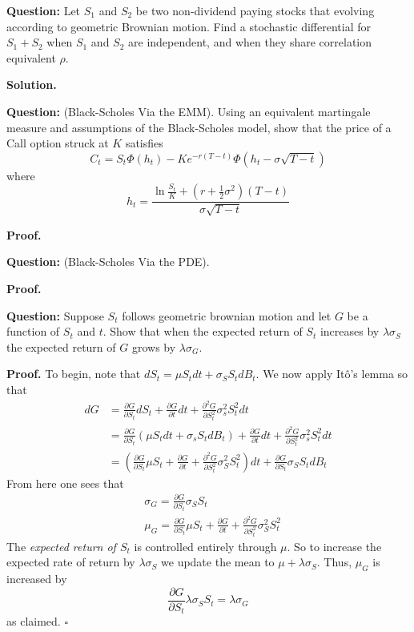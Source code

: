 \documentclass{article}
\begin{document}
\begin{tcolorbox}[colframe=black,colback=gray!5,boxrule=0.5pt]
\textbf{Question:} Let $S_1$ and $S_2$ be two non-dividend paying stocks that evolving according to geometric Brownian motion. Find a stochastic differential for $S_1 + S_2$ when $S_1$ and $S_2$ are independent, and when they share correlation equivalent $\rho$.  \cite{Hull}
\end{tcolorbox}
\textbf{Solution.}

\begin{tcolorbox}[colframe=black,colback=gray!5,boxrule=0.5pt]
\textbf{Question:} (Black-Scholes Via the EMM). Using an equivalent martingale measure and assumptions of the Black-Scholes model, show that the price of a Call option struck at $K$ satisfies
$$C_t = S_t\Phi(h_t) - Ke^{-r(T-t)}\Phi(h_t-\sigma\sqrt{T-t})$$
where 
$$h_t = \frac{\ln\frac{S_t}{K} + (r+\frac{1}{2}\sigma^2)(T-t)}{\sigma\sqrt{T-t}}$$
\end{tcolorbox}
\textbf{Proof.}

\begin{tcolorbox}[colframe=black,colback=gray!5,boxrule=0.5pt]
\textbf{Question:} (Black-Scholes Via the PDE). 
\end{tcolorbox}
\textbf{Proof.}


\begin{tcolorbox}[colframe=black,colback=gray!5,boxrule=0.5pt]
\textbf{Question:} Suppose $S_t$ follows geometric brownian motion and let $G$ be a function of $S_t$ and $t$. Show that when the expected return of $S_t$ increases by $\lambda \sigma _S$ the expected return of $G$ grows by $\lambda \sigma _G$. \cite{Hull}
\end{tcolorbox}
\textbf{Proof.} To begin, note that $dS_t = \mu S_t dt + \sigma_S S_tdB_t$. We now apply Itô's lemma so that 
\begin{align*}
   dG &= \frac{\partial G}{\partial S_t}dS_t + \frac{\partial G}{\partial t}dt + \frac{\partial^2 G}{\partial S_t^2}\sigma^2_s S_t^2dt  \\
   &= \frac{\partial G}{\partial S_t}(\mu S_t dt + \sigma_sS_tdB_t) + \frac{\partial G}{\partial t}dt + \frac{\partial^2 G}{\partial S_t^2}\sigma^2_s S_t^2dt \\
   &= \left(\frac{\partial G}{\partial S_t}\mu S_t + \frac{\partial G}{\partial t} + \frac{\partial^2 G}{\partial S_t^2}\sigma_S^2S_t^2\right)dt + \frac{\partial G}{\partial S_t}\sigma_S S_t dB_t
\end{align*}
From here one sees that 
\begin{align*}
     & \sigma_G = \frac{\partial G}{\partial S_t}\sigma_S S_t \\
    & \mu_G  = \frac{\partial G}{\partial S_t}\mu S_t + \frac{\partial G}{\partial t} + \frac{\partial^2 G}{\partial S_t^2}\sigma_S^2S_t^2
\end{align*}
The \textit{expected return of $S_t$} is controlled entirely through $\mu$. So to increase the expected rate of return by $\lambda\sigma_S$ we update the mean to $\mu + \lambda\sigma_S$. Thus, $\mu_G$ is increased by
$$\frac{\partial G}{\partial S_t}\lambda\sigma_S S_t = \lambda\sigma_G$$
as claimed. $\square$
 
\end{document}
